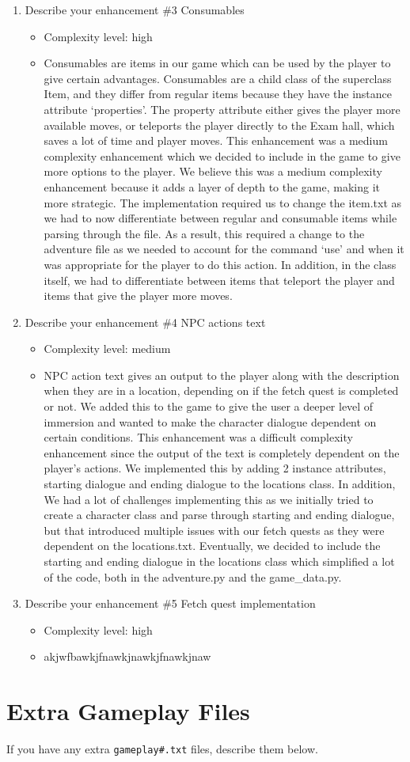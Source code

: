 \documentclass[11pt]{article}
\begin{document}
\begin{enumerate}
\item Describe your enhancement \#3 Consumables
	\begin{itemize}
	\item Complexity level: high
    \item Consumables are items in our game which can be used by the player to give certain advantages. Consumables are a child class of the superclass Item, and they differ from regular items because they have the instance attribute ‘properties’. The property attribute either gives the player more available moves, or teleports the player directly to the Exam hall, which saves a lot of time and player moves. This enhancement was a medium complexity enhancement which we decided to include in the game to give more options to the player. We believe this was a medium complexity enhancement because it adds a layer of depth to the game, making it more strategic. The implementation required us to change the item.txt as we had to now differentiate between regular and consumable items while parsing through the file. As a result, this required a change to the adventure file as we needed to account for the command ‘use’ and when it was appropriate for the player to do this action. In addition, in the class itself, we had to differentiate between items that teleport the player and items that give the player more moves.
	\end{itemize}

\item Describe your enhancement \#4 NPC actions text
	\begin{itemize}
	\item Complexity level: medium
	\item NPC action text gives an output to the player along with the description when they are in a location, depending on if the fetch quest is completed or not. We added this to the game to give the user a deeper level of immersion and wanted to make the character dialogue dependent on certain conditions. This enhancement was a difficult complexity enhancement since the output of the text is completely dependent on the player's actions. We implemented this by adding 2 instance attributes, starting dialogue and ending dialogue to the locations class. In addition, We had a lot of challenges implementing this as we initially tried to create a character class and parse through starting and ending dialogue, but that introduced multiple issues with our fetch quests as they were dependent on the locations.txt. Eventually, we decided to include the starting and ending dialogue in the locations class which simplified a lot of the code, both in the adventure.py and the game_data.py.
	\end{itemize}

\item Describe your enhancement \#5 Fetch quest implementation
	\begin{itemize}
	\item Complexity level: high
    \item akjwfbawkjfnawkjnawkjfnawkjnaw
	\end{itemize}

\end{enumerate}


\section*{Extra Gameplay Files}

If you have any extra \texttt{gameplay\#.txt} files, describe them below.
\end{document}
